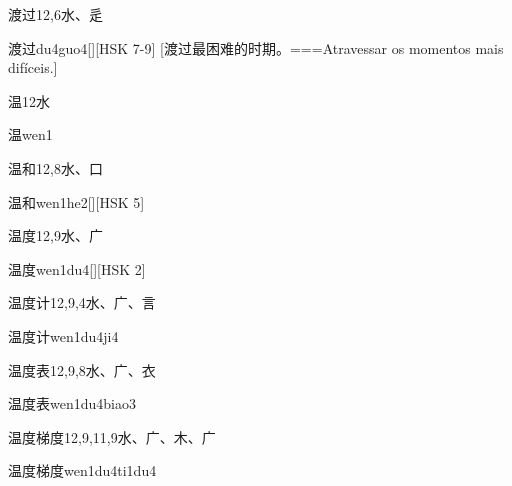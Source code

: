 \begin{Entry}{渡过}{12,6}{⽔、⾡}
  \begin{Phonetics}{渡过}{du4guo4}[][HSK 7-9]
    [渡过最困难的时期。===Atravessar os momentos mais difíceis.]
  \end{Phonetics}
\end{Entry}

\begin{Entry}{温}{12}{⽔}
  \begin{Phonetics}{温}{wen1}
  \end{Phonetics}
\end{Entry}

\begin{Entry}{温和}{12,8}{⽔、⼝}
  \begin{Phonetics}{温和}{wen1he2}[][HSK 5]
  \end{Phonetics}
\end{Entry}

\begin{Entry}{温度}{12,9}{⽔、⼴}
  \begin{Phonetics}{温度}{wen1du4}[][HSK 2]
  \end{Phonetics}
\end{Entry}

\begin{Entry}{温度计}{12,9,4}{⽔、⼴、⾔}
  \begin{Phonetics}{温度计}{wen1du4ji4}
  \end{Phonetics}
\end{Entry}

\begin{Entry}{温度表}{12,9,8}{⽔、⼴、⾐}
  \begin{Phonetics}{温度表}{wen1du4biao3}
  \end{Phonetics}
\end{Entry}

\begin{Entry}{温度梯度}{12,9,11,9}{⽔、⼴、⽊、⼴}
  \begin{Phonetics}{温度梯度}{wen1du4ti1du4}
  \end{Phonetics}
\end{Entry}

